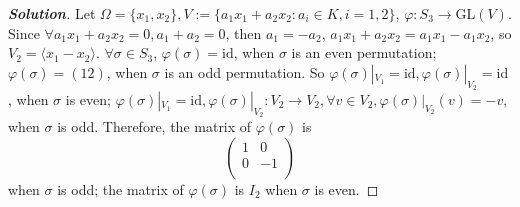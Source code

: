 \documentclass{ctexart}
\newenvironment{solution}{\begin{proof}[\textbf{Solution}]}{\end{proof}}
\renewcommand\phi{\varphi}
\renewcommand{\(}{\left(}
\renewcommand{\)}{\right)}
\renewcommand{\phi}{\varphi}
\newcommand{\id}{\mathrm{id}}
\newcommand{\GL}{\mathrm{GL}}
\begin{document}
\begin{solution}
Let $\Omega=\{x_1,x_2\}, V:=\{a_1x_1+a_2x_2:a_i\in K,i=1,2\}$, $\phi: S_3\to \GL(V)$. Since $\forall a_1x_1+a_2x_2=0, a_1+a_2=0$, then $a_1=-a_2$, $a_1x_1+a_2x_2=a_1x_1-a_1x_2$, so $V_2=\langle x_1-x_2\rangle$. 
$\forall \sigma\in S_3$, $\phi(\sigma)=\id$, when $\sigma$ is an even permutation; $\phi(\sigma)=(12)$, when $\sigma$ is an odd permutation. So $\phi(\sigma)|_{V_1}=\id,\phi(\sigma)|_{V_2}=\id$, when $\sigma$ is even; $\phi(\sigma)|_{V_1}=\id,\phi(\sigma)|_{V_2}:V_2\to V_2, \forall v\in V_2, \phi(\sigma)|_{V_2}(v)=-v$, when $\sigma$ is odd.
Therefore, the matrix of $\phi(\sigma)$ is 
\begin{equation}\(
    \begin{array}{cc}
        1 & 0\\
        0 & -1\\
    \end{array}\)
\end{equation}
when $\sigma$ is odd;  the matrix of $\phi(\sigma)$ is $I_2$ when $\sigma$ is even.

\end{solution}
\end{document}
